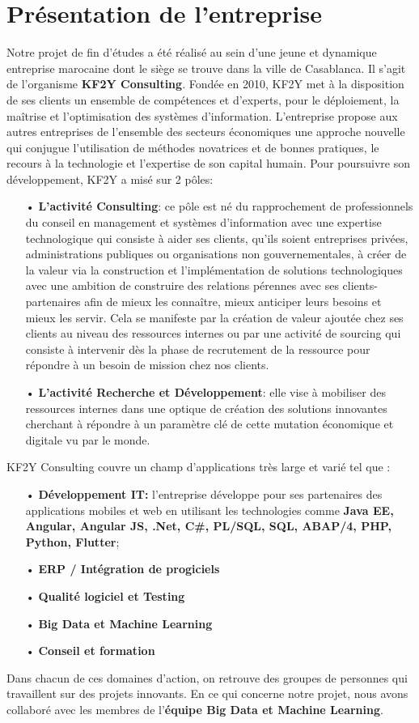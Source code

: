 \section{Présentation de l'entreprise}

Notre projet de fin d’études a été réalisé au sein d’une jeune et dynamique entreprise marocaine dont le siège se trouve dans la ville de Casablanca. Il s’agit de l’organisme \textbf{KF2Y Consulting}. Fondée en 2010, KF2Y met à la disposition de ses clients un ensemble de compétences et d’experts, pour le déploiement, la maîtrise et l’optimisation des systèmes d’information. L’entreprise propose aux autres entreprises de l'ensemble des secteurs économiques une approche nouvelle qui conjugue l'utilisation de méthodes novatrices et de bonnes pratiques, le recours à la technologie et l'expertise de son capital humain. Pour poursuivre son développement, KF2Y a misé sur 2 pôles:
    \begin{itemize}
        \item[•] \textbf{L’activité Consulting}: 
        ce pôle est né du rapprochement de professionnels du conseil en management et systèmes d’information avec une expertise technologique qui consiste à aider ses clients, qu’ils soient entreprises privées, administrations publiques ou organisations non gouvernementales, à créer de la valeur via la construction et l’implémentation de solutions technologiques avec une ambition de construire des relations pérennes avec ses  clients-partenaires afin de mieux les connaître, mieux anticiper leurs besoins et mieux les servir. Cela se manifeste par la création de valeur ajoutée chez ses clients au niveau des ressources internes ou par une activité de sourcing qui consiste à intervenir dès la phase de recrutement de la ressource pour répondre à un besoin de mission chez nos clients.
        \item[•] \textbf{L’activité Recherche et Développement}: elle vise à mobiliser des ressources internes dans une optique de création des solutions innovantes cherchant à répondre à un paramètre clé de cette mutation économique et digitale vu par le monde.
    \end{itemize}
 KF2Y Consulting couvre un champ d’applications très large et varié tel que :
    \begin{enumerate}
        \item[•] \textbf{Développement IT:} l'entreprise développe pour ses partenaires des applications mobiles et web en utilisant les technologies comme \textbf{Java EE, Angular, Angular JS, .Net, C\#, PL/SQL, SQL, ABAP/4, PHP, Python, Flutter};
        \item[•] \textbf{ERP / Intégration de progiciels}
        \item[•] \textbf{Qualité logiciel et Testing}
        \item[•] \textbf{Big Data et Machine Learning}
        \item[•]  \textbf{Conseil et formation}
    \end{enumerate}
Dans chacun de ces domaines d'action, on retrouve des groupes de personnes qui travaillent sur des projets innovants. En ce qui concerne notre projet, nous avons collaboré avec les membres de l'\textbf{équipe Big Data et Machine Learning}.


